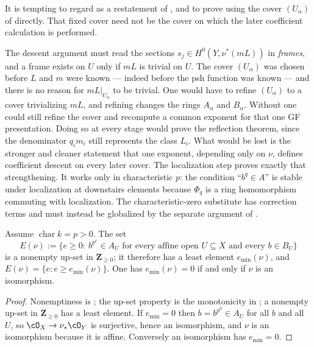 \begin{remark}
\label{rem:ch43-fixed-cover-not-enough}
It is tempting to regard  as a
restatement of , and to prove
 using the cover $(U_\alpha)$ of
 directly.  That fixed cover need not be the
cover on which the later coefficient calculation is performed.

The descent argument must read the sections $s_j\in H^0(Y,\nu^*(mL))$ in
\emph{frames}, and a frame exists on $U$ only if $mL$ is trivial on
$U$.  The cover $(U_\alpha)$ was chosen before $L$ and $m$ were
known --- indeed before the psh function was known --- and there is no
reason for $mL|_{U_\alpha}$ to be trivial.  One would have to refine
$(U_\alpha)$ to a cover trivializing $mL$, and refining changes the
rings $A_\alpha$ and $B_\alpha$.  Without
 one could still refine the cover and
recompute a common exponent for that one GF presentation.  Doing so at every
stage would prove the reflection theorem, since the denominator $q_im_i$
still represents the class $L_i$.  What would be lost is the stronger and
cleaner statement that one exponent, depending only on $\nu$, defines
coefficient descent on every later cover.  The localization step proves
exactly that strengthening.  It works only in characteristic $p$: the
condition ``$b^q\in A$'' is stable under localization at downstairs
elements because $\Phi_q$ is a ring homomorphism commuting with
localization.  The characteristic-zero substitute has correction terms and
must instead be globalized by the separate argument of
.
\end{remark}

\begin{lemma}
\label{lem:ch43-minimal-exponent}
Assume $\operatorname{char}k=p>0$.  The set
\[
 E(\nu):=\bigl\{e\ge0:\ b^{p^e}\in A_U
   \text{ for every affine open }U\subseteq X\text{ and every }b\in B_U\bigr\}
\]
is a nonempty up-set in $\mathbf Z_{\ge0}$; it therefore has a least
element $e_{\min}(\nu)$, and $E(\nu)=\{e:e\ge e_{\min}(\nu)\}$.  One has
$e_{\min}(\nu)=0$ if and only if $\nu$ is an isomorphism.
\end{lemma}

\begin{proof}
Nonemptiness is ; the up-set property
is the monotonicity in ; a nonempty
up-set in $\mathbf Z_{\ge0}$ has a least element.  If $e_{\min}=0$ then
$b=b^{p^0}\in A_U$ for all $b$ and all $U$, so
$\cO_X\to\nu_*\cO_Y$ is surjective, hence an isomorphism, and $\nu$ is
an isomorphism because it is affine.  Conversely an isomorphism has
$e_{\min}=0$.
\end{proof}

